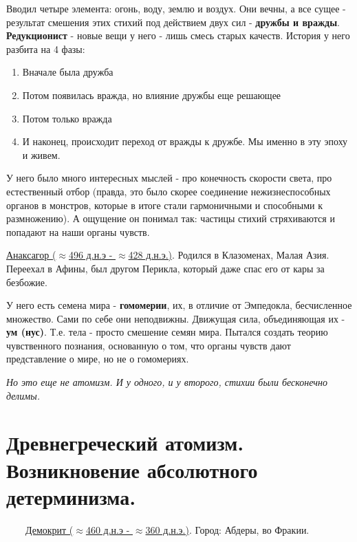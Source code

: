 \documentclass[12pt,a4paper]{article}
\begin{document}
Вводил четыре элемента: огонь, воду, землю и воздух. Они вечны, а все сущее - результат смешения этих стихий под действием двух сил - \textbf{дружбы и вражды}. \textbf{Редукционист} - новые вещи у него - лишь смесь старых качеств. История у него разбита на 4 фазы:
\begin{enumerate}
\item Вначале была дружба
\item Потом появилась вражда, но влияние дружбы еще решающее
\item Потом только вражда
\item И наконец, происходит переход от вражды к дружбе. Мы именно в эту эпоху и живем.
\end{enumerate}
У него было много интересных мыслей - про конечность скорости света, про естественный отбор (правда, это было скорее соединение нежизнеспособных органов в монстров, которые в итоге стали гармоничными и способными к размножению). А ощущение он понимал так: частицы стихий стряхиваются и попадают на наши органы чувств.

\underline{Анаксагор ($\approx$496 д.н.э - $\approx$428 д.н.э.)}. Родился в Клазоменах, Малая Азия. Переехал в Афины, был другом Перикла, который даже спас его от кары за безбожие.

У него есть семена мира - \textbf{гомомерии}, их, в отличие от Эмпедокла, бесчисленное множество. Сами по себе они неподвижны. Движущая сила, объединяющая их - \textbf{ум (нус)}. Т.е. тела - просто смешение семян мира. Пытался создать теорию чувственного познания, основанную о том, что органы чувств дают представление о мире, но не о гомомериях. 

\textit{Но это еще не атомизм. И у одного, и у второго, стихии были бесконечно делимы.} 

\section{Древнегреческий атомизм. Возникновение абсолютного детерминизма.}
\ \ \ \
\underline{Демокрит ($\approx$460 д.н.э - $\approx$360 д.н.э.)}. Город: Абдеры, во Фракии.
\end{document}
